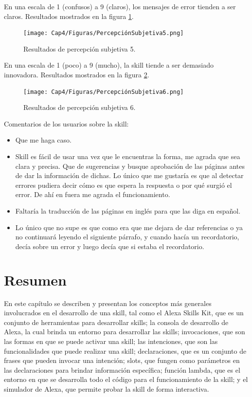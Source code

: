 En una escala de 1 (confusos) a 9 (claros), los mensajes de error tienden a ser claros. Resultados mostrados en la figura \ref{fig:430}.

\begin{figure}
  \centering
  \texttt{[image: Cap4/Figuras/PercepciónSubjetiva5.png]}
  \caption{Resultados de percepción subjetiva 5.}
  \label{fig:430}
\end{figure}

En una escala de 1 (poco) a 9 (mucho), la skill tiende a ser demasiado innovadora. Resultados mostrados en la figura \ref{fig:431}.

\begin{figure}
  \centering
  \texttt{[image: Cap4/Figuras/PercepciónSubjetiva6.png]}
  \caption{Resultados de percepción subjetiva 6.}
  \label{fig:431}
\end{figure}

Comentarios de los usuarios sobre la skill:

\begin{itemize}
  \item Que me haga caso.
  \item Skill es fácil de usar una vez que le encuentras la forma, me agrada que sea clara y precisa. Que de sugerencias y busque aprobación de las páginas antes de dar la información de dichas. Lo único que me gustaría es que al detectar errores pudiera decir cómo es que espera la respuesta o por qué surgió el error. De ahí en fuera me agrada el funcionamiento.
  \item Faltaría la traducción de las páginas en inglés para que las diga en español.
  \item Lo único que no supe es que como era que me dejara de dar referencias o ya no continuará leyendo el siguiente párrafo, y cuando hacía un recordatorio, decía sobre un error y luego decía que si estaba el recordatorio.
\end{itemize}


\section{Resumen}
\label{ResumencapIV}

En este capítulo se describen y presentan los conceptos más generales involucrados en el desarrollo de una skill, tal como el Alexa Skills Kit, que es un conjunto de herramientas para desarrollar skills; la consola de desarrollo de Alexa, la cual brinda un entorno para desarrollar las skills; invocaciones, que son las formas en que se puede activar una skill; las intenciones, que son las funcionalidades que puede realizar una skill; declaraciones, que es un conjunto de frases que pueden invocar una intención;  slots, que fungen como parámetros en las declaraciones para brindar información específica; función lambda, que es el entorno en que se desarrolla todo el código para el funcionamiento de la skill; y el simulador de Alexa, que permite probar la skill de forma interactiva.

